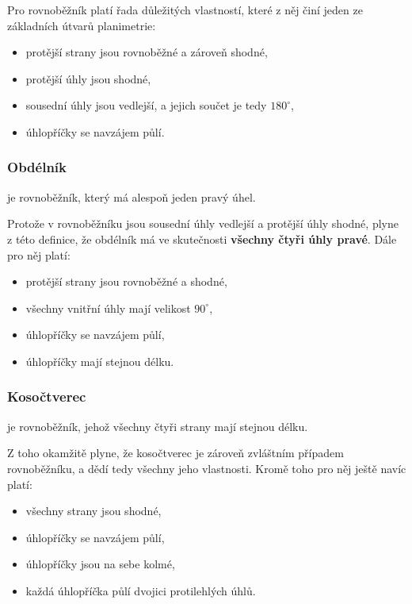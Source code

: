 \documentclass[12pt,a4paper]{article}
\begin{document}
Pro rovnoběžník platí řada důležitých vlastností, které z něj činí jeden ze základních
útvarů planimetrie:

\begin{itemize}
    \item protější strany jsou rovnoběžné a zároveň shodné,
    \item protější úhly jsou shodné,
    \item sousední úhly jsou vedlejší, a jejich součet je tedy $180^\circ$,
    \item úhlopříčky se navzájem půlí.
\end{itemize}

\subsubsection{Obdélník}

\begin{definitionbox}
 je rovnoběžník, který má alespoň jeden pravý úhel.
\end{definitionbox}

Protože v rovnoběžníku jsou sousední úhly vedlejší a protější úhly shodné, plyne z této
definice, že obdélník má ve skutečnosti \textbf{všechny čtyři úhly pravé}. Dále pro něj platí:

\begin{itemize}
    \item protější strany jsou rovnoběžné a shodné,
    \item všechny vnitřní úhly mají velikost $90^\circ$,
    \item úhlopříčky se navzájem půlí,
    \item úhlopříčky mají stejnou délku.
\end{itemize}

\subsubsection{Kosočtverec}

\begin{definitionbox}
 je rovnoběžník, jehož všechny čtyři strany mají stejnou délku.
\end{definitionbox}

Z toho okamžitě plyne, že kosočtverec je zároveň zvláštním případem rovnoběžníku,
a dědí tedy všechny jeho vlastnosti. Kromě toho pro něj ještě navíc platí:

\begin{itemize}
    \item všechny strany jsou shodné,
    \item úhlopříčky se navzájem půlí,
    \item úhlopříčky jsou na sebe kolmé,
    \item každá úhlopříčka půlí dvojici protilehlých úhlů.
\end{itemize}
\end{document}
